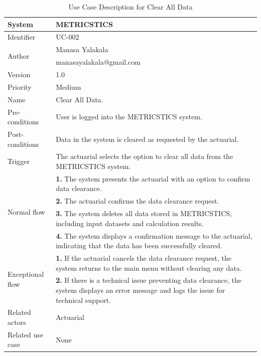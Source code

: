 \begin{table}[htb]
    \centering
    \begin{tabular}{|p{4cm}|p{12cm}|} \hline 
         System &  METRICSTICS\\ \hline 
         
         Identifier & UC-002 \\ \hline 
         
         \multirow{2}{*}{Author} & Manasa Yalakala  \\
         &manasayalakala@gmail.com \\
           \hline 
         Version & 1.0\\ \hline
         Priority &  Medium\\ \hline 
         
         Name & Clear  All Data. \\ \hline 
         Pre-conditions & User is logged into the METRICSTICS system. \\ \hline 
         Post-conditions & Data in the system is cleared as requested by the actuarial. \\ \hline
         Trigger & The actuarial selects the option to clear all data from the METRICSTICS system. \\ \hline
        \multirow{4}{*}{Normal flow} 
        & \textbf{1.}  The system presents the actuarial with an option to confirm data clearance. \\ 
        & \textbf{2.} The actuarial confirms the data clearance request. \\ 
        & \textbf{3.} The system deletes all data stored in METRICSTICS, including input datasets and calculation results. \\ 
        & \textbf{4.} The system displays a confirmation message to the actuarial, indicating that the data has been successfully cleared. \\ 
         
        
        \hline
        \multirow{2}{*}{Exceptional flow} 
        & \textbf{1.}  If the actuarial cancels the data clearance request, the system returns to the main menu without clearing any data. \\ 
        & \textbf{2.}  If there is a technical issue preventing data clearance, the system displays an error message and logs the issue for technical support. \\  \hline 
        Related actors & Actuarial \\ \hline
        Related use case & None  \\ \hline
    \end{tabular}
    \caption{Use Case Description for Clear All Data}
    \label{tab:my_label}
\end{table}
